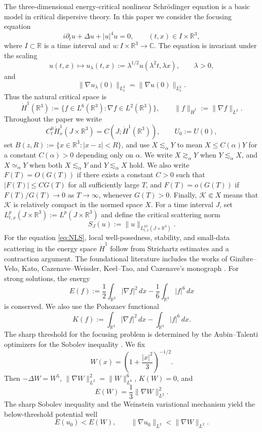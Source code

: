 \documentclass[10pt,a4paper]{amsart}
\numberwithin{equation}{section}
\newcommand{\R}{\mathbb R}
\newcommand{\C}{\mathbb C}
\begin{document}
The three-dimensional energy-critical nonlinear Schr\"odinger equation is a basic model in critical dispersive theory. In this paper we consider the focusing equation
\begin{equation}\label{eq:NLS}
  i\partial_tu+\Delta u+|u|^4u=0,
  \qquad (t,x)\in I\times\R^3,
\end{equation}
where $I\subset\R$ is a time interval and $u:I\times\R^3\to\C$. The equation is invariant under the scaling
\[
  u(t,x)\mapsto u_\lambda(t,x):=\lambda^{1/2}u(\lambda^2t,\lambda x),
  \qquad \lambda>0,
\]
and
\[
  \|\nabla u_\lambda(0)\|_{L_x^2}=\|\nabla u(0)\|_{L_x^2}.
\]
Thus the natural critical space is
\[
  \dot H^1(\R^3):=\{f\in L^6(\R^3):\nabla f\in L^2(\R^3)\},
  \qquad \|f\|_{\dot H^1}:=\|\nabla f\|_{L^2}.
\]
Throughout the paper we write
\[
  C_t^0\dot H_x^1(J\times\R^3)=C(J;\dot H^1(\R^3)),
  \qquad U_0:=U(0),
\]
set $B(z,R):=\{x\in\R^3:|x-z|<R\}$, and use $X\lesssim_\alpha Y$ to mean $X\le C(\alpha)Y$ for a constant $C(\alpha)>0$ depending only on $\alpha$. We write $X\gtrsim_\alpha Y$ when $Y\lesssim_\alpha X$, and $X\simeq_\alpha Y$ when both $X\lesssim_\alpha Y$ and $Y\lesssim_\alpha X$ hold. We also write $F(T)=O(G(T))$ if there exists a constant $C>0$ such that $|F(T)|\le C G(T)$ for all sufficiently large $T$, and $F(T)=o(G(T))$ if $F(T)/G(T)\to0$ as $T\to\infty$, whenever $G(T)>0$. Finally, $\mathcal K\Subset X$ means that $\mathcal K$ is relatively compact in the normed space $X$. For a time interval $J$, set $L_{t,x}^p(J\times\R^3):=L^p(J\times\R^3)$ and define the critical scattering norm
\[
  S_J(u):=\|u\|_{L_{t,x}^{10}(J\times\R^3)}.
\]
For the equation \eqref{eq:NLS}, local well-posedness, stability, and small-data scattering in the energy space $\dot H^1$ follow from Strichartz estimates and a contraction argument. The foundational literature includes the works of Ginibre--Velo, Kato, Cazenave--Weissler, Keel--Tao, and Cazenave's monograph \cite{GinibreVelo1979I,GinibreVelo1979II,GinibreVelo1985,Kato1987,CazenaveWeissler1990,KeelTao1998,Cazenave2003}. For strong solutions, the energy
\[
  E(f):=\frac12\int_{\R^3}|\nabla f|^2\,dx-
       \frac16\int_{\R^3}|f|^6\,dx
\]
is conserved. We also use the Pohozaev functional
\[
  K(f):=\int_{\R^3}|\nabla f|^2\,dx-
       \int_{\R^3}|f|^6\,dx.
\]
The sharp threshold for the focusing problem is determined by the Aubin--Talenti optimizers for the Sobolev inequality \cite{Aubin1976,Talenti1976}. We fix
\[
  W(x)=\left(1+\frac{|x|^2}{3}\right)^{-1/2}.
\]
Then $-\Delta W=W^5$, $\|\nabla W\|_{L^2}^2=\|W\|_{L^6}^6$, $K(W)=0$, and
\[
  E(W)=\frac13\|\nabla W\|_{L^2}^2.
\]
The sharp Sobolev inequality and the Weinstein variational mechanism \cite{Weinstein1983} yield the below-threshold potential well
\[
  E(u_0)<E(W),\qquad \|\nabla u_0\|_{L^2}<\|\nabla W\|_{L^2}.
\]
\end{document}
